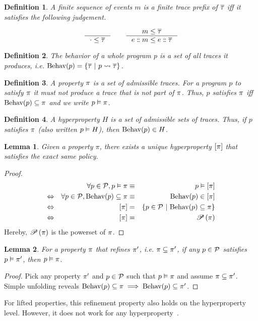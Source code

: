 \documentclass[a4paper,names,dvipsnames]{article}
\newtheorem{definition}{Definition}
\newtheorem{lemma}{Lemma}
\begin{document}
\begin{definition}
  A finite sequence of events $m$ is a finite trace prefix of $\overline{\tau}$ iff it satisfies the following judgement.

  $$
    \inference{}{\cdot\le\trace}\hspace{2em}\inference{m\le\trace}{\seqcons{e}{m}\le \seqcons{e}{\trace}}
  $$
\end{definition}

\begin{definition}
  The behavior of a whole program $p$ is a set of all traces it produces, i.e. $\behav{p}=\{\trace\ |\ \mktrace{p}{\trace}\}$.
\end{definition}

\begin{definition}
  A property $\pi$ is a set of admissible traces. For a program $p$ to satisfy $\pi$ it must not produce a trace that is not part of $\pi$. Thus, $p$ satisfies $\pi$ iff $\text{Behav}({p})\subseteq\pi$ and we write ${p}\vDash{\pi}$.
\end{definition}

\begin{definition}
  A hyperproperty $H$ is a set of admissible sets of traces. Thus, if $p$ satisfies $\pi$ (also written ${p}\vDash{H}$), then $\text{Behav}({p})\in H$.
\end{definition}

\begin{lemma}
  Given a property $\pi$, there exists a unique hyperproperty $\left[{\pi}\right]$ that satisfies the exact same policy.
\end{lemma}
\begin{proof}
  \begin{align*}
                    && \forall p\in\partials,\sat{p}{\prop}&\equiv&\sat{p}{\lift{\prop}} \\
    \Leftrightarrow && \forall p\in\partials,\behav{p}\subseteq{\prop}&\equiv&\behav{p}\in\lift{\prop} \\
    \Leftrightarrow && \lift{\prop}&=&\left\{p\in\partials\ |\ \behav{p}\subseteq\prop\right\} \\
    \Leftrightarrow && \lift{\prop}&=&\powerset{\prop}
  \end{align*}
  Hereby, $\mathscr{P}\left({\pi}\right)$ is the powerset of $\pi$.
\end{proof}

\begin{lemma}
  For a property $\pi$ that refines $\pi'$, i.e. $\pi\subseteq\pi'$, if any $p\in\mathcal{P}$ satisfies ${p}\vDash{\pi'}$, then ${p}\vDash{\pi}$.
\end{lemma}
\begin{proof}
  Pick any property $\pi'$ and $p\in\mathcal{P}$ such that ${p}\vDash{\pi}$ and assume $\pi\subseteq\pi'$.
  Simple unfolding reveals $\text{Behav}({p})\subseteq\pi\implies\text{Behav}({p})\subseteq\pi'$.
\end{proof}
\noindent
For lifted properties, this refinement property also holds on the hyperproperty level.
However, it does not work for any hyperproperty~\cite{clarkson08}.
\end{document}

